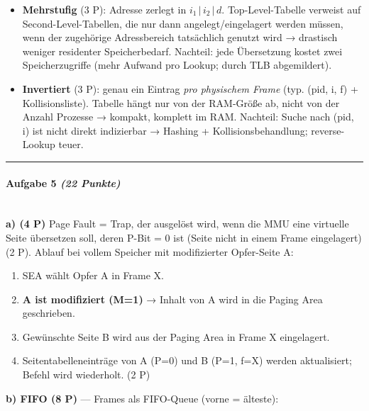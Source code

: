 \documentclass[11pt, a4paper]{article}
\begin{document}
\begin{itemize}
  \item \textbf{Mehrstufig} (3 P): Adresse zerlegt in $i_1\,|\,i_2\,|\,d$. Top-Level-Tabelle verweist auf Second-Level-Tabellen, die nur dann angelegt/eingelagert werden müssen, wenn der zugehörige Adressbereich tatsächlich genutzt wird → drastisch weniger residenter Speicherbedarf. Nachteil: jede Übersetzung kostet zwei Speicherzugriffe (mehr Aufwand pro Lookup; durch TLB abgemildert).
  \item \textbf{Invertiert} (3 P): genau ein Eintrag \textit{pro physischem Frame} (typ. (pid, i, f) + Kollisionsliste). Tabelle hängt nur von der RAM-Größe ab, nicht von der Anzahl Prozesse → kompakt, komplett im RAM. Nachteil: Suche nach (pid, i) ist nicht direkt indizierbar → Hashing + Kollisionsbehandlung; reverse-Lookup teuer.
\end{itemize}


\noindent\textcolor{rulegray}{\rule{\linewidth}{0.4pt}}


\paragraph{Aufgabe 5 \textit{(22 Punkte)}}\mbox{}\\[2pt]

\textbf{a) (4 P)} Page Fault = Trap, der ausgelöst wird, wenn die MMU eine virtuelle Seite übersetzen soll, deren P-Bit = 0 ist (Seite nicht in einem Frame eingelagert) (2 P). Ablauf bei vollem Speicher mit modifizierter Opfer-Seite A:

\begin{enumerate}
  \item SEA wählt Opfer A in Frame X.
  \item \textbf{A ist modifiziert (M=1)} → Inhalt von A wird in die Paging Area geschrieben.
  \item Gewünschte Seite B wird aus der Paging Area in Frame X eingelagert.
  \item Seitentabelleneinträge von A (P=0) und B (P=1, f=X) werden aktualisiert; Befehl wird wiederholt. (2 P)
\end{enumerate}

\textbf{b) FIFO (8 P)} — Frames als FIFO-Queue (vorne = älteste):
\end{document}
